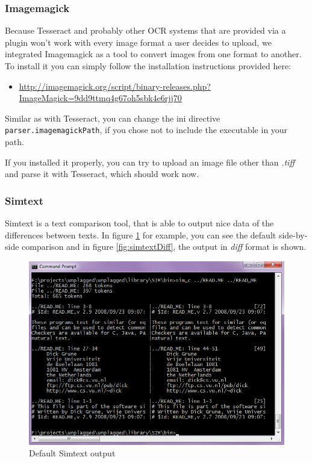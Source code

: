 \subsubsection{Imagemagick}

Because Tesseract and probably other OCR systems that are provided via a plugin won't work with every image format a 
user decides to upload, we integrated Imagemagick as a tool to convert images from one format to another. To install
it you can simply follow the installation instructions provided here:

\begin{itemize}
\item \url{http://imagemagick.org/script/binary-releases.php?ImageMagick=9dd9ttmq4g67oh5sbk4e6rjj70}
\end{itemize}

Similar as with Tesseract, you can change the ini directive \texttt{parser.imagemagickPath}, if you chose not to include
the executable in your path.

If you installed it properly, you can try to upload an image file other than \textit{.tiff} and parse it with Tesseract,
which should work now.

\subsubsection{Simtext}

Simtext is a text comparison tool, that is able to output nice data of the differences between texts. In figure 
\ref{fig:simtextOutput} for example, you can see the default side-by-side comparison and in figure \ref{fig:simtextDiff}, 
the output in \textit{diff} format is shown.

\begin{figure}[htbp]
  \centering
    \includegraphics[width=\textwidth]{images/simtext-output.png}
  \caption{Default Simtext output}
  \label{fig:simtextOutput}
\end{figure}

